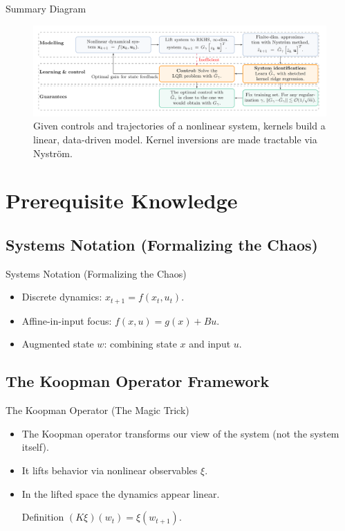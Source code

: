 \documentclass{beamer}
\begin{document}
\begin{frame}{Summary Diagram}
\begin{figure}
  \centering
  \includegraphics[width=\linewidth]{summary.png}
  \caption{Given controls and trajectories of a nonlinear system, kernels build a linear, data-driven model. Kernel inversions are made tractable via Nyström.}
\end{figure}
\end{frame}

\section{Prerequisite Knowledge}

\subsection{Systems Notation (Formalizing the Chaos)}
\begin{frame}{Systems Notation (Formalizing the Chaos)}
\begin{itemize}
  \item Discrete dynamics: $x_{t+1} = f(x_t, u_t)$.
  \item Affine-in-input focus: $f(x,u)=g(x)+Bu$.
  \item Augmented state $w$: combining state $x$ and input $u$.
\end{itemize}
\end{frame}

\subsection{The Koopman Operator Framework}
\begin{frame}{The Koopman Operator (The Magic Trick)}
\begin{itemize}
  \item The Koopman operator transforms our view of the system (not the system itself).
  \item It lifts behavior via nonlinear observables $\xi$.
  \item In the lifted space the dynamics appear linear.
  \begin{block}{Definition}
    $(K\xi)(w_t)=\xi(w_{t+1})$.
  \end{block}
\end{itemize}
\end{frame}
\end{document}
